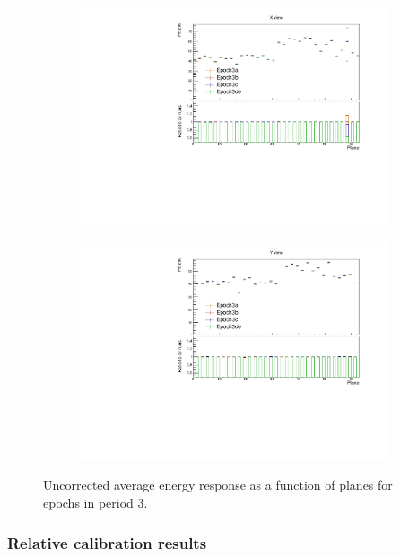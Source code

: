 \documentclass[12pt,a4paper]{article}
\begin{document}
\begin{figure}[!hbtp]
\centering
\begin{subfigure}[b]{0.495\textwidth}
\centering
\includegraphics[width=\textwidth]{Plots/Attenprofs_P3Data_PlanePE_X_Combined.pdf}
\end{subfigure}
\begin{subfigure}[b]{0.495\textwidth}
\centering
\includegraphics[width=\textwidth]{Plots/Attenprofs_P3Data_PlanePE_Y_Combined.pdf}
\end{subfigure}
\caption{Uncorrected average energy response as a function of planes for epochs in period 3.}
\label{figCalibhistPlanePE_period3}
\end{figure}

\subsubsection{Relative calibration results}
\end{document}
